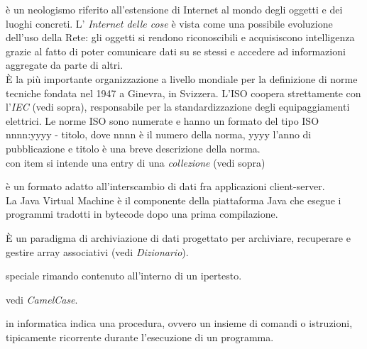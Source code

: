 \documentclass{scalatekids-article}
\begin{document}
 è un neologismo riferito all'estensione di Internet al mondo degli oggetti e dei luoghi concreti.
L' \textit{Internet delle cose} è vista come una possibile evoluzione dell'uso della Rete: gli oggetti si rendono riconoscibili e acquisiscono intelligenza grazie al fatto di poter comunicare dati su se stessi e accedere ad informazioni aggregate da parte di altri.
\\

   È la più importante organizzazione a livello mondiale per la definizione di norme tecniche fondata nel 1947 a Ginevra, in Svizzera.
  L'ISO coopera strettamente con l'\textit{IEC} (vedi sopra), responsabile per la standardizzazione degli equipaggiamenti elettrici.
  Le norme ISO sono numerate e hanno un formato del tipo ISO nnnn:yyyy - titolo, dove nnnn è il numero della norma, yyyy l'anno di pubblicazione e titolo è una breve descrizione della norma.
  \\
  
   con item si intende una entry di una \textit{collezione} (vedi sopra)
  \\


   è un formato adatto all'interscambio di dati fra applicazioni client-server.
  \\

   La Java Virtual Machine è il componente della piattaforma Java che esegue i programmi tradotti in bytecode dopo una prima compilazione.
  \\


   È un paradigma di archiviazione di dati progettato per archiviare, recuperare e gestire array associativi (vedi \textit{Dizionario}).
  \\

  
   speciale rimando contenuto all'interno di un ipertesto.

   vedi \textit{CamelCase}.
  \\


   in informatica indica una procedura, ovvero un insieme di comandi o istruzioni, tipicamente ricorrente durante l'esecuzione di un programma.
  \\
\end{document}
